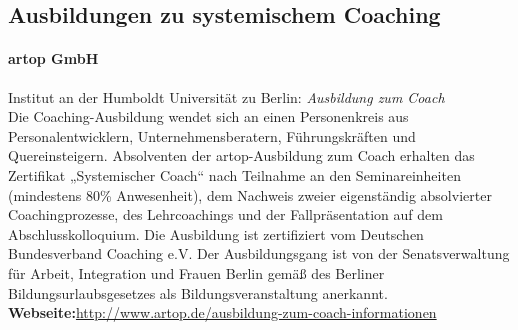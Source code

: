\documentclass[11pt,a4paper]{article}
\begin{document}
\subsection*{\textsf{Ausbildungen zu systemischem Coaching}}





\paragraph{\textsf{artop GmbH}} Institut an der Humboldt Universität zu Berlin: \textsl{Ausbildung zum Coach}\\
Die Coaching-Ausbildung wendet sich an einen Personenkreis aus Personalentwicklern, Unternehmensberatern, Führungskräften und Quereinsteigern. Absolventen der artop-Ausbildung zum Coach erhalten das Zertifikat „Systemischer Coach“ nach Teilnahme an den Seminareinheiten (mindestens 80\% Anwesenheit), dem Nachweis zweier eigenständig absolvierter Coachingprozesse, des Lehrcoachings und der Fallpräsentation auf dem Abschlusskolloquium. Die Ausbildung ist zertifiziert vom Deutschen Bundesverband Coaching e.V. Der Ausbildungsgang ist von der Senatsverwaltung für Arbeit, Integration und Frauen Berlin gemäß des Berliner Bildungsurlaubsgesetzes als Bildungsveranstaltung anerkannt.\\
\textbf{Webseite:}\textsf{\textcolor{MidnightBlue}{\url{http://www.artop.de/ausbildung-zum-coach-informationen}}}
\end{document}
